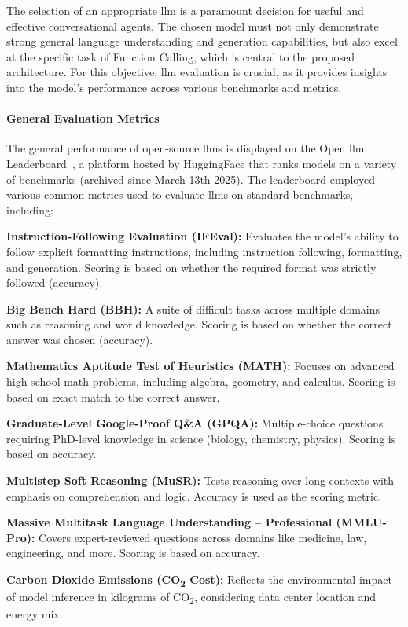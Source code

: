 The selection of an appropriate \ac{llm} is a paramount decision for useful and effective conversational agents. The chosen model must not only demonstrate strong general language understanding and generation capabilities, but also excel at the specific task of Function Calling, which is central to the proposed architecture. For this objective, \ac{llm} evaluation is crucial, as it provides insights into the model's performance across various benchmarks and metrics.

\paragraph{General Evaluation Metrics}

The general performance of open-source \acp{llm} is displayed on the Open \acs{llm} Leaderboard~\cite{OPEN-LLM-LEADERBOARD}, a platform hosted by HuggingFace that ranks models on a variety of benchmarks (archived since March 13th 2025). The leaderboard employed various common metrics used to evaluate \acp{llm} on standard benchmarks, including:

\begin{compactitem}[\textbullet]    
    \item \textbf{Instruction-Following Evaluation (IFEval):} Evaluates the model's ability to follow explicit formatting instructions, including instruction following, formatting, and generation. Scoring is based on whether the required format was strictly followed (accuracy).
    
    \item \textbf{Big Bench Hard (BBH):} A suite of difficult tasks across multiple domains such as reasoning and world knowledge. Scoring is based on whether the correct answer was chosen (accuracy).
    
    \item \textbf{Mathematics Aptitude Test of Heuristics (MATH):} Focuses on advanced high school math problems, including algebra, geometry, and calculus. Scoring is based on exact match to the correct answer.
    
    \item \textbf{Graduate-Level Google-Proof Q\&A (GPQA):} Multiple-choice questions requiring PhD-level knowledge in science (biology, chemistry, physics). Scoring is based on accuracy.
    
    \item \textbf{Multistep Soft Reasoning (MuSR):} Tests reasoning over long contexts with emphasis on comprehension and logic. Accuracy is used as the scoring metric.
    
    \item \textbf{Massive Multitask Language Understanding – Professional (MMLU-Pro):} Covers expert-reviewed questions across domains like medicine, law, engineering, and more. Scoring is based on accuracy.

    \item \textbf{Carbon Dioxide Emissions (CO\textsubscript{2} Cost):} Reflects the environmental impact of model inference in kilograms of CO\textsubscript{2}, considering data center location and energy mix.
\end{compactitem}

